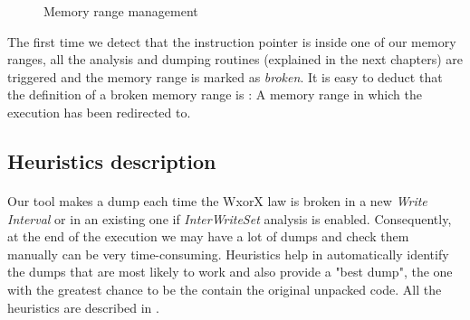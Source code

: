 \begin{figure}[H]
\caption{Memory range management}
\end{figure} 

The first time we detect that the instruction pointer is inside one of our memory ranges, all the analysis and dumping routines (explained in the next chapters) are triggered and the memory range is marked as \textit{broken}. It is easy to deduct that the definition of a broken memory range is : A memory range in which the execution has been redirected to. 

\subsection{Heuristics description}
\paragraph{}
Our tool makes a dump each time the \ac{WxorX} law is broken in a new \textit{Write Interval} or in an existing one if \textit{InterWriteSet} analysis is enabled. Consequently, at the end of the execution we may have a lot of dumps and check them manually can be very time-consuming. Heuristics help in automatically identify the dumps that are most likely to work and also provide a "best dump", the one with the greatest chance to be the contain the original unpacked code. All the heuristics are described in \cite{Practical_Malware_Analysis}.
